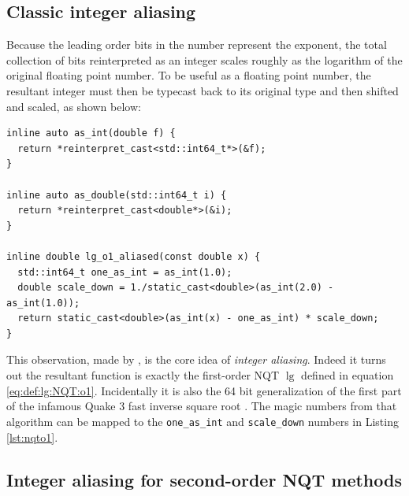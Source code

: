 \documentclass[linenumbers,twocolumn]{aastex631}
\begin{document}
\subsection{Classic integer aliasing}
\label{sec:bithack:classic}

Because the leading order bits in the number represent the exponent, the total collection of bits reinterpreted as an integer scales roughly as the logarithm of the original floating point number. To be useful as a floating point number, the resultant integer must then be typecast back to its original type and then shifted and scaled, as shown below:
\begin{lstlisting}[caption={The basic integer-aliased NQTo1 log}, label={lst:nqto1}]
inline auto as_int(double f) {
  return *reinterpret_cast<std::int64_t*>(&f);
}

inline auto as_double(std::int64_t i) {
  return *reinterpret_cast<double*>(&i);
}

inline double lg_o1_aliased(const double x) {
  std::int64_t one_as_int = as_int(1.0);
  double scale_down = 1./static_cast<double>(as_int(2.0) - as_int(1.0));
  return static_cast<double>(as_int(x) - one_as_int) * scale_down;
}
\end{lstlisting}
This observation, made by \citet{Blinn}, is the core idea of \textit{integer aliasing}. Indeed it turns out the resultant function is exactly the first-order NQT $\lg$ defined in equation \eqref{eq:def:lg:NQT:o1}. Incidentally it is also the 64 bit generalization of the first part of the infamous Quake 3 fast inverse square root \citep{fastinvqrt,WizardryOfId}. The magic numbers from that algorithm can be mapped to the {\tt one\_as\_int} and {\tt scale\_down} numbers in Listing \ref{lst:nqto1}.

\subsection{Integer aliasing for second-order NQT methods}
\label{sec:aliasing:NQT:o2}
\end{document}
